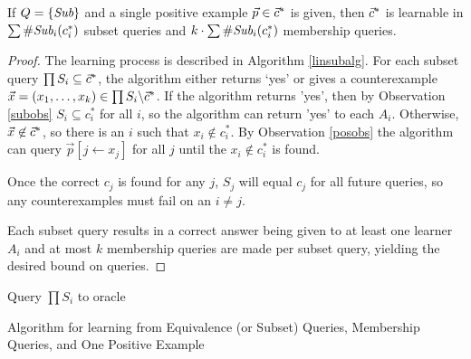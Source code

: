 \begin{proposition}
If $Q = \{\emph{Sub}\}$ and a single positive example $\vec{p} \in \vec{c}^*$ is given, then $\vec{c}^*$ is learnable in $\sum \#\emph{Sub}_{i}(c^*_i)$ subset queries and $k \cdot \sum \#\emph{Sub}_{i}(c^*_i)$ membership queries. 
\end{proposition}
\begin{proof}
The learning process is described in Algorithm \ref{linsubalg}.
For each subset query $\prod S_i \subseteq \vec{c}^*$, the algorithm either returns `yes' or gives a counterexample $\vec{x} = (x_1, \dots, x_k) \in \prod S_i \backslash \vec{c}^*$. 
If the algorithm returns 'yes', then by Observation \ref{subobs} $S_i \subseteq c^*_i$ for all $i$, so the algorithm can return 'yes' to each $A_i$. 
Otherwise, $\vec{x} \not\in \vec{c}^*$, so there is an $i$ such that $x_i \not\in c^*_i$. 
By Observation \ref{posobs} the algorithm can query $\vec{p}[j \leftarrow x_j]$ for all $j$ until the $x_i \not\in c^*_i$ is found. 

Once the correct $c_j$ is found for any $j$, $S_j$ will equal $c_j$ for all future queries, so any counterexamples must fail on an $i \ne j$. 

Each subset query results in a correct answer being given to at least one learner $A_i$ and at most $k$ membership queries are made per subset query, yielding the desired bound on queries. 
\end{proof}

\begin{algorithm}[H]
\label{lineqalg}
\SetAlgoLined
{}
  Query $\prod S_i$ to oracle\;
\caption{Algorithm for learning from Equivalence (or Subset)  Queries, Membership Queries, and One Positive Example}
\end{algorithm}



